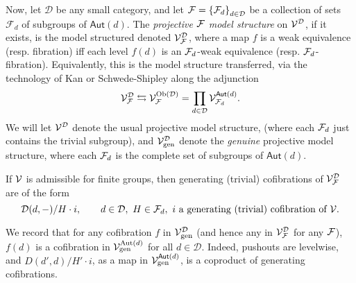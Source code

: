 \documentclass[a4paper,10pt]{article}%
\begin{document}
\begin{definition}
      Now, let $\mathcal D$ be any small category, 
      and let $\mathcal F = \left\{\mathcal F_d\right\}_{d\in \mathcal D}$ be a collection of sets $\mathcal F_d$ of subgroups of $\mathsf{Aut}(d)$.
      The \textit{projective $\mathcal F$ model structure} on $\mathcal V^{\mathcal D}$, if it exists, 
      is the model structured denoted $\mathcal V^{\mathcal D}_{\mathcal F}$, 
      where a map $f$ is a weak equivalence (resp. fibration) 
      iff 
      each level $f(d)$ is an $\mathcal F_d$-weak equivalence (resp. $\mathcal F_d$-fibration). 
      Equivalently, this is the model structure transferred, via the technology of Kan \cite[11.3.2]{Hi03} or Schwede-Shipley \cite[2.3]{SS00} along the adjunction
      \[
      \mathcal V^{\mathcal D}_{\mathcal F} \leftrightarrows \mathcal V^{\text{Ob}(\mathcal D)}_{\mathcal F} = \prod_{d\in \mathcal D}\mathcal V^{\mathsf{Aut}(d)}_{\mathcal F_d}.
      \]
      We will let $\mathcal V^{\mathcal D}$ denote the usual projective model structure, 
      (where each $\mathcal F_d$ just contains the trivial subgroup),
      and 
      $\mathcal V^{\mathcal D}_{\text{gen}}$ denote the \textit{genuine} projective model structure, 
      where each $\mathcal F_d$ is the complete set of subgroups of $\mathsf{Aut}(d)$. 
\end{definition}

If $\mathcal V$ is admissible for finite groups, then generating (trivial) cofibrations of $\mathcal V^{\mathcal D}_{\mathcal F}$ are of the form 
\[
\mathcal D(d,-)/H \cdot i,\qquad d\in \mathcal D,\ H\in \mathcal F_d,\ i \mbox{ a generating (trivial) cofibration of $\mathcal V$}.
\]

\begin{remark}
      \label{LEVEL_COFIB_REMARK}
      We record that for any cofibration $f$ in 
      $\mathcal V^{\mathcal D}_{\text{gen}}$ (and hence any in $\mathcal V^{\mathcal D}_{\mathcal F}$ for any $\mathcal F$), 
      $f(d)$ is a cofibration in $\mathcal V^{\mathrm{Aut}(d)}_{\text{gen}}$ for all $d\in \mathcal D$. 
      Indeed, 
      pushouts are levelwise, 
      and
      $D(d',d)/H' \cdot i$, as a map in $\mathcal V^{\mathsf{Aut}(d)}_{\text{gen}}$, is a coproduct of generating cofibrations.
\end{remark}
\end{document}
